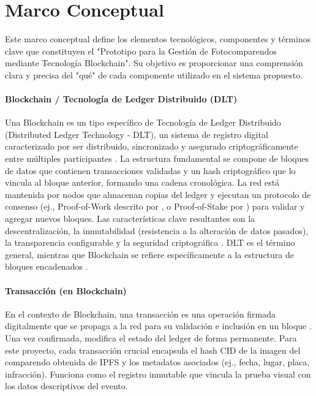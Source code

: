 \documentclass[
    letterpaper, 
    man,   
    spanish,
    12pt,
    donotrepeattitle,
    floatsintext,
    hidelinks %
]{apa7}
\renewcommand{\large}{\fontsize{14.4}{18}\selectfont}
\begin{document}
\section{\large Marco Conceptual}
Este marco conceptual define los elementos tecnológicos, componentes y términos clave que constituyen el "Prototipo para la Gestión de Fotocomparendos mediante Tecnología Blockchain". Su objetivo es proporcionar una comprensión clara y precisa del "qué" de cada componente utilizado en el sistema propuesto. 

\paragraph{Blockchain / Tecnología de Ledger Distribuido (DLT)}
Una Blockchain es un tipo específico de Tecnología de Ledger Distribuido (Distributed Ledger Technology - DLT), un sistema de registro digital caracterizado por ser distribuido, sincronizado y asegurado criptográficamente entre múltiples participantes \parencite{narayanan2016bitcoin}. La estructura fundamental se compone de bloques de datos que contienen transacciones validadas y un hash criptográfico que lo vincula al bloque anterior, formando una cadena cronológica. La red está mantenida por nodos que almacenan copias del ledger y ejecutan un protocolo de consenso (ej., Proof-of-Work descrito por \parencite{nakamoto2008bitcoin}, o Proof-of-Stake por \parencite{king2012ppcoin}) para validar y agregar nuevos bloques. Las características clave resultantes son la descentralización, la inmutabilidad (resistencia a la alteración de datos pasados), la transparencia configurable y la seguridad criptográfica \parencite{swan2015blockchain}. DLT es el término general, mientras que Blockchain se refiere específicamente a la estructura de bloques encadenados \parencite{ukgov2016dlt}.

\paragraph{Transacción (en Blockchain)} 

En el contexto de Blockchain, una transacción es una operación firmada digitalmente que se propaga a la red para su validación e inclusión en un bloque \parencite{antonopoulos2023mastering}. Una vez confirmada, modifica el estado del ledger de forma permanente. Para este proyecto, cada transacción crucial encapsula el hash CID de la imagen del comparendo obtenida de IPFS y los metadatos asociados (ej., fecha, lugar, placa, infracción). Funciona como el registro inmutable que vincula la prueba visual con los datos descriptivos del evento. 
\end{document}
